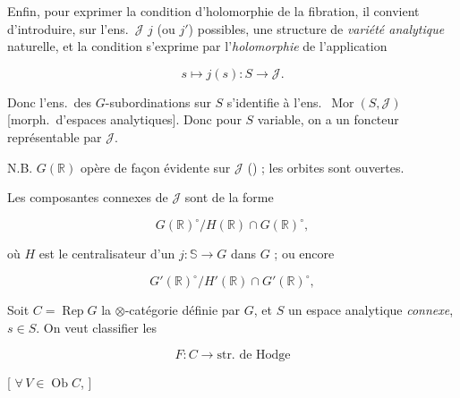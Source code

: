 \documentclass[11pt,a4paper]{article}
\begin{document}


Enfin, pour exprimer la condition d'holomorphie de la fibration, il convient
d'introduire,  sur l'ens.\ $\mathcal{J}$  $j$ (ou $j'$)
possibles, une structure de \emph{variété analytique} 
naturelle, et la condition s'exprime par l'\emph{holomorphie} de l'application

\[ s \mapsto j(s) : S \longrightarrow \mathcal{J} . \]

 Donc l'ens.\ des $G$-subordinations 
 sur $S$ s'identifie à l'ens.\ $\operatorname{Mor}(S,
\mathcal{J})$ [morph.\ d'espaces analytiques]. Donc pour $S$ variable, on a un
foncteur représentable par $\mathcal{J}$.

N.B. $G(\mathbb{R})$ opère de façon évidente sur $\mathcal{J}$ (\ill{}) ; les
orbites sont ouvertes.


Les composantes connexes de $\mathcal{J}$ sont de la forme

\[ G(\mathbb{R})^{\circ} / H(\mathbb{R}) \cap G(\mathbb{R})^{\circ} , \]

où $H$ est le centralisateur d'un $j : \mathbb{S} \to G$ dans $G$ ; ou encore

\[ G'(\mathbb{R})^{\circ} / H'(\mathbb{R}) \cap G'(\mathbb{R})^{\circ} , \]



Soit $C = \operatorname{Rep} G$ la $\otimes$-catégorie définie par $G$, et $S$
un espace analytique \emph{connexe}, $s \in S$. On veut classifier les
  

\[ F : C \longrightarrow \text{str. de Hodge} \]


[\struck{\ill{}} $\forall\, V \in \operatorname{Ob} C$,  ]
\end{document}
